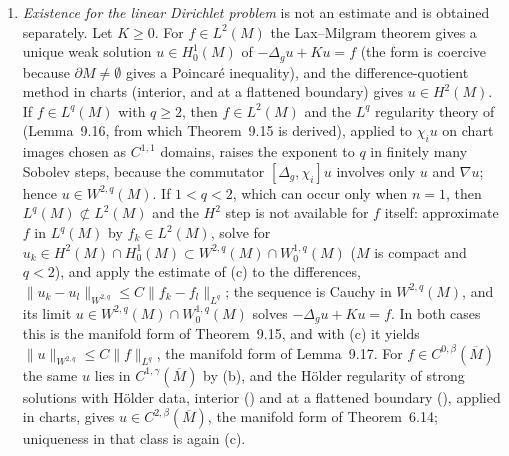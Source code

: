 \documentclass[11pt]{article}
\theoremstyle{plain}
\theoremstyle{definition}
\theoremstyle{remark}
\begin{document}
\begin{enumerate}[label=(\alph*)]
\item \emph{Existence for the linear Dirichlet problem} is not an estimate and is obtained separately. Let \(K\ge 0\). For \(f\in L^2(M)\) the Lax--Milgram theorem gives a unique weak solution \(u\in H^1_0(M)\) of \(-\Delta_g u+Ku=f\) (the form is coercive because \(\partial M\neq\emptyset\) gives a Poincar\'e inequality), and the difference-quotient method in charts (interior, and at a flattened boundary) gives \(u\in H^2(M)\). If \(f\in L^q(M)\) with \(q\ge 2\), then \(f\in L^2(M)\) and the \(L^q\) regularity theory of~\cite[Ch.~9]{GilbargTrudinger2001} (Lemma~9.16, from which Theorem~9.15 is derived), applied to \(\chi_i u\) on chart images chosen as \(C^{1,1}\) domains, raises the exponent to \(q\) in finitely many Sobolev steps, because the commutator \([\Delta_g,\chi_i]u\) involves only \(u\) and \(\nabla u\); hence \(u\in W^{2,q}(M)\). If \(1<q<2\), which can occur only when \(n=1\), then \(L^q(M)\not\subset L^2(M)\) and the \(H^2\) step is not available for \(f\) itself: approximate \(f\) in \(L^q(M)\) by \(f_k\in L^2(M)\), solve for \(u_k\in H^2(M)\cap H^1_0(M)\subset W^{2,q}(M)\cap W^{1,q}_0(M)\) (\(M\) is compact and \(q<2\)), and apply the estimate of (c) to the differences, \(\|u_k-u_l\|_{W^{2,q}}\le C\|f_k-f_l\|_{L^q}\); the sequence is Cauchy in \(W^{2,q}(M)\), and its limit \(u\in W^{2,q}(M)\cap W^{1,q}_0(M)\) solves \(-\Delta_g u+Ku=f\). In both cases this is the manifold form of Theorem~9.15, and with (c) it yields \(\|u\|_{W^{2,q}}\le C\|f\|_{L^q}\), the manifold form of Lemma~9.17. For \(f\in C^{0,\beta}(\overline M)\) the same \(u\) lies in \(C^{1,\gamma}(\overline M)\) by (b), and the H\"older regularity of strong solutions with H\"older data, interior (\cite[Ch.~9]{GilbargTrudinger2001}) and at a flattened boundary (\cite[Ch.~6]{GilbargTrudinger2001}), applied in charts, gives \(u\in C^{2,\beta}(\overline M)\), the manifold form of Theorem~6.14; uniqueness in that class is again (c).

\end{enumerate}
\end{document}
